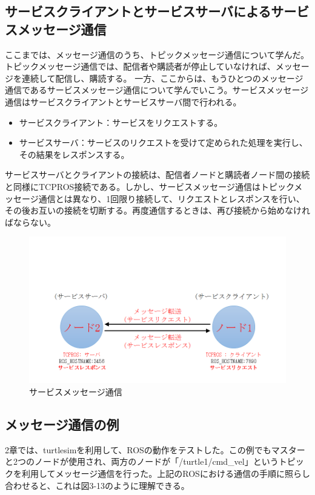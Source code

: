 \subsection{サービスクライアントとサービスサーバによるサービスメッセージ通信}
ここまでは、メッセージ通信のうち、トピックメッセージ通信について学んだ。トピックメッセージ通信では、配信者や購読者が停止していなければ、メッセージを連続して配信し、購読する。
一方、ここからは、もうひとつのメッセージ通信であるサービスメッセージ通信について学んでいこう。サービスメッセージ通信はサービスクライアントとサービスサーバ間で行われる。

\begin{itemize}
\item サービスクライアント：サービスをリクエストする。
\item サービスサーバ：サービスのリクエストを受けて定められた処理を実行し、その結果をレスポンスする。
\end{itemize}
サービスサーバとクライアントの接続は、配信者ノードと購読者ノード間の接続と同様にTCPROS接続である。しかし、サービスメッセージ通信はトピックメッセージ通信とは異なり、1回限り接続して、リクエストとレスポンスを行い、その後お互いの接続を切断する。再度通信するときは、再び接続から始めなければならない。

\begin{figure}[h]
  \centering
  \includegraphics[width=\columnwidth]{pictures/chapter3/pic_03_12.png}
  \caption{サービスメッセージ通信}
\end{figure}

\subsection{メッセージ通信の例}
2章では、turtlesimを利用して、ROSの動作をテストした。この例でもマスターと2つのノードが使用され、両方のノードが「/turtle1/cmd\_vel」というトピックを利用してメッセージ通信を行った。上記のROSにおける通信の手順に照らし合わせると、これは図3-13のように理解できる。

